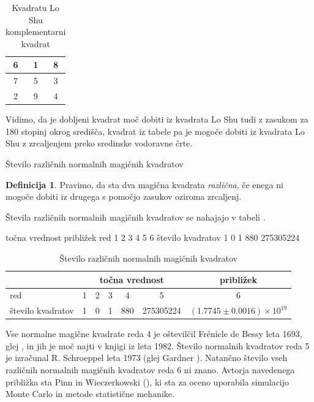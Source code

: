 \documentclass[a4paper,12pt]{article}
\newcommand{\pojem}[1]{\emph{\color{purple}#1}}
\theoremstyle{plain}
\theoremstyle{definition}
\newtheorem{definicija}{Definicija}
\theoremstyle{proof}
\begin{document}
\begin{table} [htp]
   \caption{Kvadratu Lo Shu komplementarni kvadrat}
   \centering
   \large
   
\begin{tabular}{|c|c|c|}
\hline
6 & 1 & 8 \\\hline
7 & 5 & 3 \\\hline
 2 & 9 & 4 \\\hline
\end{tabular}
\label{ttable:closhu}
\end{table}


Vidimo, da je dobljeni kvadrat moč dobiti iz kvadrata Lo Shu tudi z zasukom za
180 stopinj okrog središča, kvadrat iz tabele \cite {ref}pa je mogoče dobiti
iz kvadrata Lo Shu z zrcaljenjem preko sredinske vodoravne črte.

Število različnih normalnih magičnih kvadratov

\begin{definicija}
      Pravimo, da sta dva magična kvadrata \pojem{različna}, če enega ni mogoče dobiti
      iz drugega s pomočjo zasukov oziroma zrcaljenj.
\end{definicija}

Števila različnih normalnih magičnih kvadratov se nahajajo v tabeli \cite{table:stevila}.

      točna vrednost približek
      red 1 2 3 4 5 6
      število kvadratov 1 0 1 880 275305224 


\begin{table} 
   \caption{Število različnih normalnih magičnih kvadratov}
   \centering
\begin{tabular}{lcccccc}\toprule
   & \multicolumn{5}{c}{točna vrednost} & približek \\
\midrule
    red & 1 & 2 & 3 & 4 & 5 & 6  \\
    število kvadratov & 1 & 0 & 1 & 880 & 275305224 &
       \((1.7745 \pm 0.0016) \times 10^{19}\) \\
\bottomrule
\end{tabular}


   \label{table:stevila}

\end{table}

Vse normalne magične kvadrate reda 4 je oštevilčil Frénicle de Bessy
leta 1693, glej \cite{bessy}, in jih je moč najti v knjigi \cite{berlekamp}
iz leta 1982. Število normalnih kvadratov reda 5 je izračunal
R. Schroeppel leta 1973 (glej Gardner \cite{gardner}).
Natančno število vseh različnih normalnih magičnih kvadratov reda 6 ni znano.
Avtorja navedenega približka sta Pinn in Wieczerkowski (\cite{pinn}), ki
sta za oceno uporabila simulacijo Monte Carlo in metode statistične mehanike.
\end{document}
